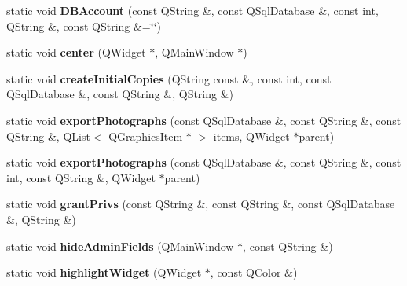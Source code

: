 \begin{DoxyCompactItemize}
\item 
static void {\bfseries D\+B\+Account} (const Q\+String \&, const Q\+Sql\+Database \&, const int, Q\+String \&, const Q\+String \&=\char`\"{}\char`\"{})\hypertarget{classbiblioteq__misc__functions_a92774b099b02ab9449f870fea6e57786}{}\label{classbiblioteq__misc__functions_a92774b099b02ab9449f870fea6e57786}

\item 
static void {\bfseries center} (Q\+Widget $\ast$, Q\+Main\+Window $\ast$)\hypertarget{classbiblioteq__misc__functions_a3ce07ebbd27c40cceee559e85ec3d8cc}{}\label{classbiblioteq__misc__functions_a3ce07ebbd27c40cceee559e85ec3d8cc}

\item 
static void {\bfseries create\+Initial\+Copies} (Q\+String const \&, const int, const Q\+Sql\+Database \&, const Q\+String \&, Q\+String \&)\hypertarget{classbiblioteq__misc__functions_a94300a7d47f9e3ce8ade689a62522909}{}\label{classbiblioteq__misc__functions_a94300a7d47f9e3ce8ade689a62522909}

\item 
static void {\bfseries export\+Photographs} (const Q\+Sql\+Database \&, const Q\+String \&, const Q\+String \&, Q\+List$<$ Q\+Graphics\+Item $\ast$ $>$ items, Q\+Widget $\ast$parent)\hypertarget{classbiblioteq__misc__functions_a32d310e4f0963588fee0d87b5f386db6}{}\label{classbiblioteq__misc__functions_a32d310e4f0963588fee0d87b5f386db6}

\item 
static void {\bfseries export\+Photographs} (const Q\+Sql\+Database \&, const Q\+String \&, const int, const Q\+String \&, Q\+Widget $\ast$parent)\hypertarget{classbiblioteq__misc__functions_ae2bd920b209abc86b3bff93b8c800c5a}{}\label{classbiblioteq__misc__functions_ae2bd920b209abc86b3bff93b8c800c5a}

\item 
static void {\bfseries grant\+Privs} (const Q\+String \&, const Q\+String \&, const Q\+Sql\+Database \&, Q\+String \&)\hypertarget{classbiblioteq__misc__functions_a78d2384016151d69b7e5036967b82e9f}{}\label{classbiblioteq__misc__functions_a78d2384016151d69b7e5036967b82e9f}

\item 
static void {\bfseries hide\+Admin\+Fields} (Q\+Main\+Window $\ast$, const Q\+String \&)\hypertarget{classbiblioteq__misc__functions_afdb024c7d1a4444b3f2decf76dbfe146}{}\label{classbiblioteq__misc__functions_afdb024c7d1a4444b3f2decf76dbfe146}

\item 
static void {\bfseries highlight\+Widget} (Q\+Widget $\ast$, const Q\+Color \&)\hypertarget{classbiblioteq__misc__functions_a26fa4acf326b4156081d1814ab68b47c}{}\label{classbiblioteq__misc__functions_a26fa4acf326b4156081d1814ab68b47c}


\end{DoxyCompactItemize}
